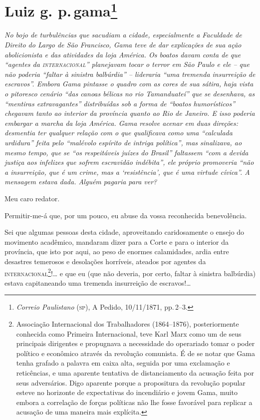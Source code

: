 \chapter{Luiz g. p.\,gama\footnote{\emph{Correio Paulistano} (\textsc{sp}), A Pedido, 10/11/1871,
  pp.\,2--3.}} %

\begin{didascalia}
\emph{No bojo de turbulências que sacudiam a cidade, especialmente a
Faculdade de Direito do Largo de São Francisco, Gama teve de dar
explicações de sua ação abolicionista e das atividades da loja América.
Os boatos davam conta de que ``agentes da \textsc{internacional}'' planejavam tocar
o terror em São Paulo e ele -- que não poderia ``faltar à sinistra
balbúrdia'' -- lideraria ``uma tremenda insurreição de escravos''. Embora
Gama pintasse o quadro com as cores de sua sátira, haja vista o
pitoresco cenário ``das canoas bélicas no rio Tamanduateí'' que se
desenhava, as ``mentiras extravagantes'' distribuídas sob a forma de
``boatos humorísticos'' chegavam tanto ao interior da província quanto ao
Rio de Janeiro. E isso poderia embargar a marcha da loja América. Gama
resolve acenar em duas direções: desmentia ter qualquer relação com o
que qualificava como uma ``calculada urdidura'' feita pelo ``malévolo
espírito de intriga política'', mas sinalizava, ao mesmo tempo, que se
``os respeitáveis juízes do Brasil'' faltassem ``com a devida justiça aos
infelizes que sofrem escravidão indébita'', ele próprio promoveria ``não a
insurreição, que é um crime, mas a `resistência', que é uma virtude
cívica''. A mensagem estava dada. Alguém pagaria para ver?}
\end{didascalia}


Meu caro redator.

Permitir-me-á que, por um pouco, eu abuse da vossa reconhecida
benevolência.

Sei que algumas pessoas desta cidade, aproveitando caridosamente o
ensejo do movimento acadêmico, mandaram dizer para a Corte e para o
interior da província, que isto por aqui, ao peso de enormes
calamidades, ardia entre desastres temerosos e desolações horríveis,
ateados por agentes da \textsc{internacional}\footnote{ Associação Internacional
  dos Trabalhadores (1864--1876), posteriormente conhecida como Primeira
  Internacional, teve Karl Marx como um de seus principais dirigentes e
  propugnava a necessidade do operariado tomar o poder político e
  econômico através da revolução comunista. É de se notar que Gama tenha
  grafado a palavra em caixa alta, seguida por uma exclamação e
  reticências, e uma aparente tentativa de distanciamento da acusação
  feita por seus adversários. Digo aparente porque a propositura da
  revolução popular esteve no horizonte de expectativas do incendiário e
  jovem Gama, muito embora a correlação de forças políticas não lhe
  fosse favorável para replicar a acusação de uma maneira mais
  explícita.}!\ldots{} e que eu (que não deveria, por certo, faltar à
sinistra balbúrdia) estava capitaneando uma tremenda insurreição de
escravos!\ldots{}

